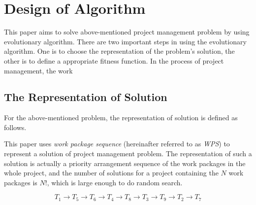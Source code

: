 %
%

\section{Design of Algorithm}
%
This paper aims to solve above-mentioned project management problem by using
evolutionary algorithm. There are two important steps in using the evolutionary
algorithm. One is to choose the representation of the problem's solution, the
other is to define a appropriate fitness function. In the process of project
management, the work





\subsection{The Representation of Solution}
%
For the above-mentioned problem, the representation of solution is defined as
follows.


This paper uses \emph{work package sequence} (hereinafter referred to as \emph{WPS}) to
represent a solution of project management problem. The representation of such a
solution is actually a priority arrangement sequence of the work packages in
the whole project, and the number of solutions for a project containing the $N$
work packages is $N!$, which is large enough to do random search.

\begin{equation}
  T_1 \rightarrow T_5 \rightarrow T_6 \rightarrow T_4 \rightarrow T_8
  \rightarrow T_3 \rightarrow T_9 \rightarrow T_2 \rightarrow T_7
  \label{repr}
\end{equation}

